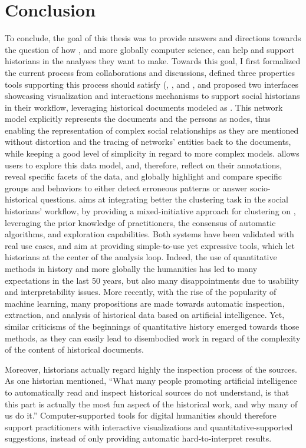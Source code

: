 \section{Conclusion}


To conclude, the goal of this thesis was to provide answers and directions towards the question of how \va, and more globally computer science, can help and support historians in the analyses they want to make.
Towards this goal, I first formalized the current \hsna process from collaborations and discussions, defined three properties tools supporting this process should satisfy (\traceability, \simplicity, and \reality, and proposed two interfaces showcasing visualization and interactions mechanisms to support social historians in their workflow, leveraging historical documents modeled as \modelplural.
This network model explicitly represents the documents and the persons as nodes, thus enabling the representation of complex social relationships as they are mentioned without distortion and the tracing of networks' entities back to the documents, while keeping a good level of simplicity in regard to more complex models.
\combinet allows users to explore this data model, and, therefore, reflect on their annotations, reveal specific facets of the data, and globally highlight and compare specific groups and behaviors to either detect erroneous patterns or answer socio-historical questions.
\pkclustering aims at integrating better the clustering task in the social historians' workflow, by providing a mixed-initiative approach for clustering on \modelplural, leveraging the prior knowledge of practitioners, the consensus of automatic algorithms, and exploration capabilities.
Both systems have been validated with real use cases, and aim at providing simple-to-use yet expressive tools, which let historians at the center of the analysis loop.
Indeed, the use of quantitative methods in history and more globally the humanities has led to many expectations in the last 50 years, but also many disappointments due to usability and interpretability issues.
More recently, with the rise of the popularity of machine learning, many propositions are made towards automatic inspection, extraction, and analysis of historical data based on artificial intelligence.
Yet, similar criticisms of the beginnings of quantitative history emerged towards those methods, as they can easily lead to disembodied work in regard of the complexity of the content of historical documents.


Moreover, historians actually regard highly the inspection process of the sources.
As one historian mentioned, ``What many people promoting artificial intelligence to automatically read and inspect historical sources do not understand, is that this part is actually the most fun aspect of the historical work, and why many of us do it.''
Computer-supported tools for digital humanities should therefore support practitioners with interactive visualizations and quantitative-supported suggestions, instead of only providing automatic hard-to-interpret results.

